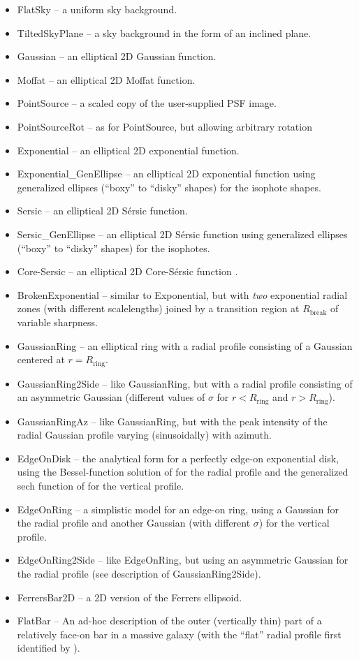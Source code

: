\documentclass[10pt,a4paper,article]{memoir}
\begin{document}
\begin{itemize}
\item FlatSky -- a uniform sky background.
\item TiltedSkyPlane -- a sky background in the form of an inclined plane.
\item Gaussian -- an elliptical 2D Gaussian function.
\item Moffat -- an elliptical 2D Moffat function.
\item PointSource -- a scaled copy of the user-supplied PSF image.
\item PointSourceRot -- as for PointSource, but allowing arbitrary rotation
\item Exponential -- an elliptical 2D exponential function.
\item Exponential\_GenEllipse -- an elliptical 2D exponential function using
generalized ellipses (``boxy'' to ``disky'' shapes) for the isophote shapes.
\item Sersic -- an elliptical 2D S\'ersic function.
\item Sersic\_GenEllipse -- an elliptical 2D S\'ersic function using
generalized ellipses (``boxy'' to ``disky'' shapes) for the isophotes.
\item Core-Sersic -- an elliptical 2D Core-S\'ersic function \citep{graham03,trujillo04}.
\item BrokenExponential -- similar to Exponential, but with \textit{two}
exponential radial zones (with different scalelengths) joined by a transition region
at $R_{\mathrm{break}}$ of variable sharpness.
\item GaussianRing -- an elliptical ring with a radial profile
consisting of a Gaussian centered at $r = R_{\mathrm{ring}}$.
\item GaussianRing2Side -- like GaussianRing, but with a radial profile
consisting of an asymmetric Gaussian (different values of $\sigma$ for
$r < R_{\mathrm{ring}}$ and $r > R_{\mathrm{ring}}$).
\item GaussianRingAz -- like GaussianRing, but with the peak intensity of the
radial Gaussian profile varying (sinusoidally) with azimuth.
\item EdgeOnDisk -- the analytical form for a perfectly edge-on exponential
disk, using the Bessel-function solution of \citet{vdk81} for 
the radial profile and the generalized sech function of \citet{vdk88} 
for the vertical profile.
\item EdgeOnRing -- a simplistic model for an edge-on ring, using a
Gaussian for the radial profile and another Gaussian (with
different $\sigma$) for the vertical profile.
\item EdgeOnRing2Side -- like EdgeOnRing, but using an
asymmetric Gaussian for the radial profile (see description of GaussianRing2Side).
\item FerrersBar2D -- a 2D version of the Ferrers ellipsoid.
\item FlatBar -- An ad-hoc description of the outer (vertically thin) part of a
relatively face-on bar in a massive galaxy (with the ``flat'' radial profile first
identified by \cite{ee85}).

\end{itemize}
\end{document}
